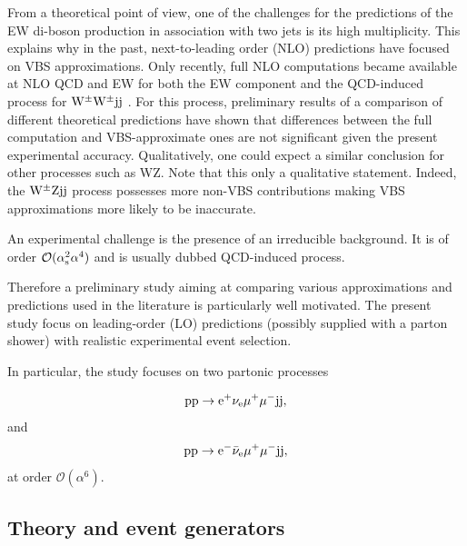 \documentclass[11pt]{cernrep}
\newcommand{\MP}[1]{{ {\color{blue}{ [MP: #1]}} }}
\begin{document}
From a theoretical point of view, one of the challenges for the predictions of the EW di-boson production in association with two jets is its high multiplicity.
This explains why in the past, next-to-leading order (NLO) predictions have focused on VBS approximations.
Only recently, full NLO computations became available at NLO QCD and EW for both the EW component and the QCD-induced process for ${\rm W}^\pm{\rm W}^\pm{\rm j}{\rm j}$ \cite{Biedermann:2017bss}.
For this process, preliminary results \cite{Anders:2018gfr} of a comparison of different theoretical predictions have shown that differences between the full computation and VBS-approximate ones are not significant given the present experimental accuracy.
Qualitatively, one could expect a similar conclusion for other processes such as WZ.
Note that this only a qualitative statement.
Indeed, the ${\rm W}^{\pm}{\rm Z}{\rm j}{\rm j}$ process possesses more non-VBS contributions making VBS approximations more likely to be inaccurate.

An experimental challenge is the presence of an irreducible background.
It is of order $\mathcal{O} (\alpha_{\rm s}^2 \alpha^4)$ and is usually dubbed QCD-induced process.
\MP{Some extra comments on the specific experimental challenges to measure WZ.}

Therefore a preliminary study aiming at comparing various approximations and predictions used in the literature is particularly well motivated.
The present study focus on leading-order (LO) predictions (possibly supplied with a parton shower) with realistic experimental event selection.
\MP{Explain what we do here depending on what we have.}

In particular, the study focuses on two partonic processes

\begin{equation}
 {\rm p} {\rm p} \to {\rm e}^+  \nu_{\rm e}  \mu^+ \mu^- {\rm j} {\rm j} ,
\end{equation}
%
and
%
\begin{equation}
 {\rm p} {\rm p} \to {\rm e}^-  \bar \nu_{\rm e}  \mu^+ \mu^- {\rm j} {\rm j},
\end{equation}
%
at order $\mathcal{O} (\alpha^6)$.


\subsection{Theory and event generators \label{vbs_theory}}
\end{document}
